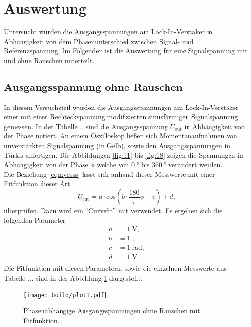 \section{Auswertung}

Untersucht wurden die Ausgangsspannungen am Lock-In-Verstäker in Abhängigkeit von dem Phasenunterschied zwischen Signal- und Referenzspannung. Im Folgenden ist die Auswertung 
für eine Signalspannung mit und ohne Rauschen unterteilt.

\subsection{Ausgangsspannung ohne Rauschen}
In diesem Versuchsteil wurden die Ausgangsspannungen am Lock-In-Verstäker einer mit einer Rechteckspannung modifizierten sinusförmigen Signalspannung gemessen. In der Tabelle ..
sind die Ausgangsspannung $U_{\text{out}}$ in Abhängigkeit von der Phase notiert. An einem Oszilloskop ließen sich Momentanaufnahmen von unverstärkten Signalspannung (in Gelb), sowie den Ausgangsspannungen in Türkis anfertigen.
Die Abbildungen \ref{fig:11} bis \ref{fig:18} zeigen die Spannungen in Abhängigkeit von der Phase $\phi$ welche von $\SI{0}{\degree}$ bis $\SI{360}{\degree}$ verändert werden.
\\
\newline 
Die Beziehung \eqref{eqn:yesss} lässt sich anhand dieser Messwerte mit einer Fitfunktion dieser Art 
\begin{equation}
    \label{eqn:fit}
U_{\text{out}} = a \cdot \text{cos}(b \cdot \frac{180}{\pi} \phi + c) + d,
\end{equation}
überprüfen. Dazu wird ein \enquote{Curvefit} mit \cite{scipy} verwendet.
Es ergeben sich die folgenden Parameter
\begin{align}
    a &= \SI{1}{\volt},\\
    b &= \SI{1}{},\\
    c &= \SI{1}{\radian},\\
    d &= \SI{1}{\volt}.\\
\end{align}
Die Fitfunktion mit diesen Parametern, sowie die einzelnen Messwerte aus Tabelle ... sind in der Abbildung \ref{fig:licht} dargestellt.
\begin{figure}
    \centering
    \texttt{[image: build/plot1.pdf]}
    \caption{Phasenabhängige Ausgangsspannungen ohne Rauschen mit Fitfunktion.} 
    \label{fig:licht}
\end{figure}
